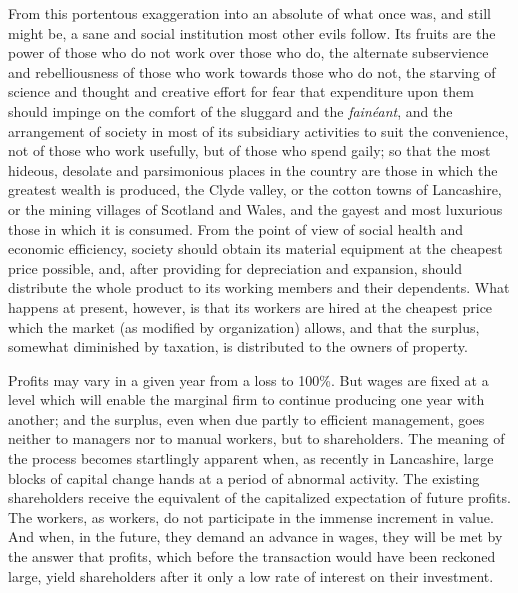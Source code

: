 \documentclass{book}
\begin{document}
From this portentous exaggeration into an absolute of what once was, and still might be, a sane and social institution most other evils follow. Its fruits are the power of those who do not work over those who do, the alternate subservience and rebelliousness of those who work towards those who do not, the starving of science and thought and creative effort for fear that expenditure upon them should impinge on the comfort of the sluggard and the \emph{fainéant}, and the arrangement of society in most of its subsidiary activities to suit the convenience, not of those who work usefully, but of those who spend gaily; so that the most hideous, desolate and parsimonious places in the country are those in which the greatest wealth is produced, the Clyde valley, or the cotton towns of Lancashire, or the mining villages of Scotland and Wales, and the gayest and most luxurious those in which it is consumed. From the point of view of social health and economic efficiency, society should obtain its material equipment at the cheapest price possible, and, after providing for depreciation and expansion, should distribute the whole product to its working members and their dependents. What happens at present, however, is that its workers are hired at the cheapest price which the market (as modified by organization) allows, and that the surplus, somewhat diminished by taxation, is distributed to the owners of property.

Profits may vary in a given year from a loss to 100\%. But wages are fixed at a level which will enable the marginal firm to continue producing one year with another; and the surplus, even when due partly to efficient management, goes neither to managers nor to manual workers, but to shareholders. The meaning of the process becomes startlingly apparent when, as recently in Lancashire, large blocks of capital change hands at a period of abnormal activity. The existing shareholders receive the equivalent of the capitalized expectation of future profits. The workers, as workers, do not participate in the immense increment in value. And when, in the future, they demand an advance in wages, they will be met by the answer that profits, which before the transaction would have been reckoned large, yield shareholders after it only a low rate of interest on their investment.
\end{document}
